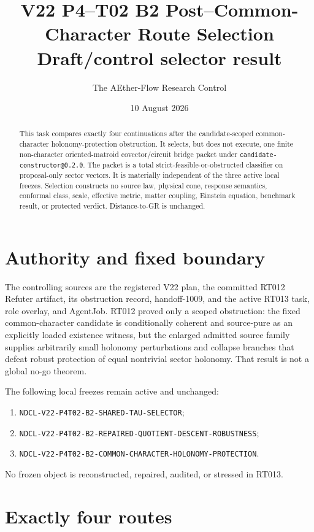 \documentclass[11pt]{article}
\title{V22 P4--T02 B2 Post--Common-Character Route Selection\\
\large Draft/control selector result}
\author{The AEther-Flow Research Control}
\date{10 August 2026}
\begin{document}
\maketitle

\begin{abstract}
This task compares exactly four continuations after the candidate-scoped
common-character holonomy-protection obstruction.  It selects, but does not
execute, one finite non-character oriented-matroid covector/circuit bridge
packet under \texttt{candidate-constructor@0.2.0}.  The packet is a total
strict-feasible-or-obstructed classifier on proposal-only sector vectors.  It
is materially independent of the three active local freezes.  Selection
constructs no source law, physical cone, response semantics, conformal class,
scale, effective metric, matter coupling, Einstein equation, benchmark result,
or protected verdict.  Distance-to-GR is unchanged.
\end{abstract}

\section{Authority and fixed boundary}

The controlling sources are the registered V22 plan, the committed RT012
Refuter artifact, its obstruction record, handoff-1009, and the active RT013
task, role overlay, and AgentJob.  RT012 proved only a scoped obstruction:
the fixed common-character candidate is conditionally coherent and
source-pure as an explicitly loaded existence witness, but the enlarged
admitted source family supplies arbitrarily small holonomy perturbations and
collapse branches that defeat robust protection of equal nontrivial sector
holonomy.  That result is not a global no-go theorem.

The following local freezes remain active and unchanged:
\begin{enumerate}
  \item \texttt{NDCL-V22-P4T02-B2-SHARED-TAU-SELECTOR};
  \item \texttt{NDCL-V22-P4T02-B2-REPAIRED-QUOTIENT-DESCENT-ROBUSTNESS};
  \item \texttt{NDCL-V22-P4T02-B2-COMMON-CHARACTER-HOLONOMY-PROTECTION}.
\end{enumerate}
No frozen object is reconstructed, repaired, audited, or stressed in RT013.

\section{Exactly four routes}
\end{document}
